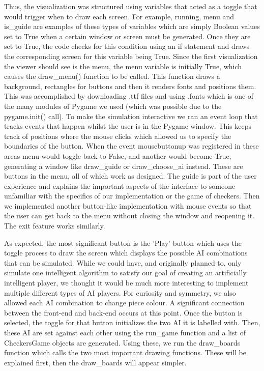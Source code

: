 \documentclass[fontsize=11pt]{article}
\begin{document}
Thus, the visualization was structured using variables that acted as a toggle that would trigger when to draw each screen. For example, running, menu and is\_guide are examples of these types of variables which are simply Boolean values set to True when a certain window or screen must be generated. Once they are set to True, the code checks for this condition using an if statement and draws the corresponding screen for this variable being True. Since the first visualization the viewer should see is the menu, the menu variable is initially True, which causes the draw\_menu() function to be called. This function draws a background, rectangles for buttons and then it renders fonts and positions them. This was accomplished by downloading .ttf files and using .fonts which is one of the many modules of Pygame we used (which was possible due to the pygame.init() call). To make the simulation interactive we ran an event loop that tracks events that happen whilst the user is in the Pygame window. This keeps track of positions where the mouse clicks which allowed us to specify the boundaries of the button. When the event mousebuttonup was registered in these areas menu would toggle back to False, and another would become True, generating a window like draw\_guide or draw\_choose\_ai instead. These are buttons in the menu, all of which work as designed. The guide is part of the user experience and explains the important aspects of the interface to someone unfamiliar with the specifics of our implementation or the game of checkers. Then we implemented another button-like implementation with mouse events so that the user can get back to the menu without closing the window and reopening it. The exit feature works similarly. 

As expected, the most significant button is the 'Play' button which uses the toggle process to draw the screen which displays the possible AI combinations that can be simulated. While we could have, and originally planned to, only simulate one intelligent algorithm to satisfy our goal of creating an artificially intelligent player, we thought it would be much more interesting to implement multiple different types of AI players. For curiosity and symmetry, we also allowed each AI combination to change piece colour. A significant connection between the front-end and back-end occurs at this point. Once the button is selected, the toggle for that button initializes the two AI it is labelled with. Then, these AI are set against each other using the run\_game function and a list of CheckersGame objects are generated. Using these, we run the draw\_boards function which calls the two most important drawing functions. These will be explained first, then the draw\_boards will appear simpler.
\end{document}
